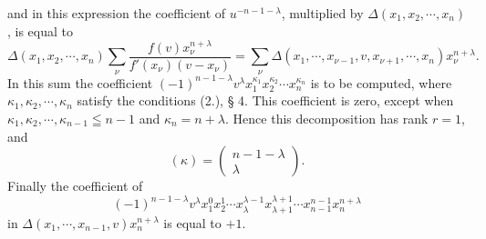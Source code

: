 \documentclass[11pt]{article}
\begin{document}
and in this expression the coefficient of $u^{-n-1-
\lambda}$, multiplied by $\Delta(x_1,x_2,
\cdots,x_n)$, is equal to
\[
 \Delta(x_1,x_2,
\cdots,x_n)\sum_\nu\frac{f(v)x_\nu^{n+\lambda}}{f'(x_\nu)(v-x_\nu)}
 =\sum_\nu\Delta(x_1,
\cdots,x_{\nu-1},v,x_{\nu+1},
\cdots,x_n)x_\nu^{n+
\lambda}.
\]
In this sum the coefficient $(-1)^{n-1-
\lambda}v^\lambda x_1^{\kappa_1}x_2^{\kappa_2}\cdots x_n^{\kappa_n}$ is to be computed, where $\kappa_1,
\kappa_2,
\cdots,
\kappa_n$ satisfy the conditions (2.), § 4. This coefficient is zero, except when $\kappa_1,
\kappa_2,
\cdots,
\kappa_{n-1}\leqq n-1$ and $\kappa_n=n+
\lambda$. Hence this decomposition has rank $r=1$, and
\[
 (\kappa)=\left(\begin{matrix}n-1-
\lambda\\ \lambda\end{matrix}\right).
\]
Finally the coefficient of
\[
 (-1)^{n-1-
\lambda}v^\lambda x_1^0x_2^1\cdots x_\lambda^{\lambda-1}x_{\lambda+1}^{\lambda+1}\cdots x_{n-1}^{n-1}x_n^{n+
\lambda}
\]
in $\Delta(x_1,
\cdots,x_{n-1},v)x_n^{n+
\lambda}$ is equal to $+1$.
\end{document}
